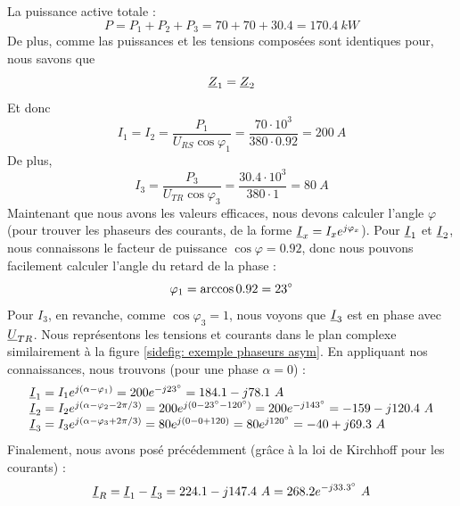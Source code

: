 \documentclass[12pt,a4paper]{article}
\newcommand{\uz}{\uline{Z} }
\newcommand{\ui}{\uline{I} }
\newcommand{\uu}{\uline{U} }
\begin{document}
 La puissance active totale :
\[P = P_1 + P_2 + P_3 = 70 + 70 + 30.4 = 170.4\ kW\]
De plus, comme las puissances et les tensions composées sont identiques pour, nous savons que 
\[\uz_1 = \uz_2\]
Et donc 
\[I_1 = I_2 = \frac{P_1}{U_{RS}\cos\varphi_1} = \frac{70\cdot 10^3}{380\cdot 0.92} = 200\ A\]
De plus, 
\[I_3 = \frac{P_3}{U_{TR} \cos\varphi_3} = \frac{30.4 \cdot 10^3}{380 \cdot 1} = 80\ A\]
Maintenant que nous avons les valeurs efficaces, nous devons calculer l'angle $\varphi$ (pour trouver les phaseurs des courants, de la forme $\ui_x = I_xe^{j\varphi_x}$). Pour $\ui_1$ et $\ui_2$, nous connaissons le facteur de puissance $\cos \varphi = 0.92$, donc nous pouvons facilement calculer l'angle du retard de la phase :
\[\varphi_1 = \arccos 0.92 = 23^\circ\]
Pour $I_3$, en revanche, comme $\cos\varphi_3 = 1$, nous voyons que $\ui_3$ est en phase avec $\uu_{TR}$. Nous représentons les tensions et courants dans le plan complexe similairement à la figure \ref{sidefig: exemple phaseurs asym}. En appliquant nos connaissances, nous trouvons (pour une phase $\alpha = 0$) :
\[\begin{array}{l}
	\ui_1 = I_1e^{j(\alpha - \varphi_1)} = 200e^{-j23\degre} = 184.1 - j78.1\ A\\
	\ui_2 = I_2e^{j(\alpha - \varphi_2 - 2\pi/3)} = 200e^{j(0-23\degre-120\degre)} = 200e^{-j143\degre} = -159-j120.4\ A\\
	\ui_3 = I_3e^{j(\alpha - \varphi_3 + 2\pi/3)} = 80e^{j(0-0+120)} = 80e^{j120\degre} = -40+j69.3\ A
\end{array}\]
Finalement, nous avons posé précédemment (grâce à la loi de Kirchhoff pour les courants) :
\[\ui_R = \ui_1 - \ui_3 = 224.1-j147.4\ A = 268.2e^{-j33.3\degre}\ A\]
\end{document}
